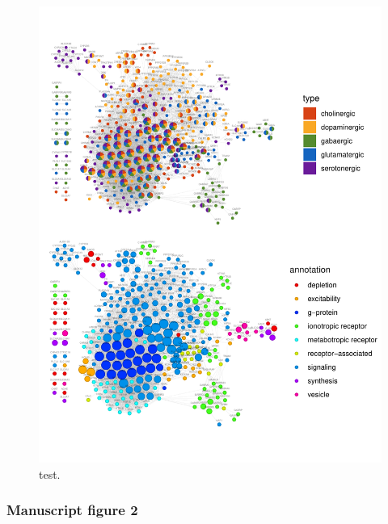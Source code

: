 \begin{Shaded}
\begin{Highlighting}[]
\end{Highlighting}
\end{Shaded}

\clearpage

\begin{figure}
\centering
\includegraphics[width=\textwidth,height=0.9\textheight]{figs/analysis.network.fig1_raw-1}
\caption{test.}
\end{figure}

\clearpage

\hypertarget{manuscript-figure-2}{%
\subsubsection{Manuscript figure 2}\label{manuscript-figure-2}}

